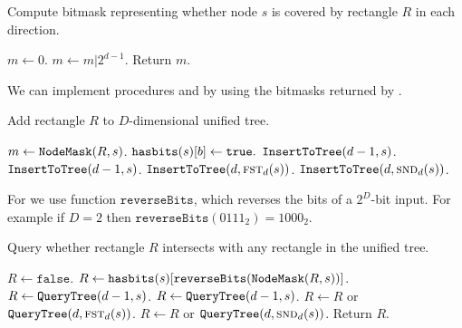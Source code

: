 \documentclass[english,gradu]{tktltiki2018}
\begin{document}
\begin{alg}\label{alg:maskof}
Compute bitmask representing whether node $s$ is covered by rectangle $R$ in each direction.
\begin{algorithmic}
	\State $m\gets 0$.
			\State $m\gets m | 2^{d-1}$.
		\EndIf
	\EndFor
	\State Return $m$.
\EndProcedure
\end{algorithmic}
\end{alg}

We can implement procedures \adddt and \checkdt by using the bitmasks returned by \maskof{}.

\begin{alg}\label{alg:uadd}
Add rectangle $R$ to $D$-dimensional unified tree.
\begin{algorithmic}
		\State $m\gets\texttt{NodeMask}(R,s)$.
				\State $\texttt{hasbits}(s)[b]\gets\texttt{true}.$
			\EndIf
		\EndFor
		\State $\texttt{InsertToTree}(d-1,s)$.
		\State $\texttt{InsertToTree}(d-1,s)$.
		\State $\texttt{InsertToTree}(d,\textsc{fst}_{d}(s))$.
		\State $\texttt{InsertToTree}(d,\textsc{snd}_{d}(s))$.
	\EndIf
\EndProcedure
\end{algorithmic}
\end{alg}

For \checkdt we use function $\texttt{reverseBits}$, which reverses the bits of a $2^D$-bit input.
For example if $D=2$ then $\texttt{reverseBits}(0111_2)=1000_2$.

\begin{alg}\label{alg:ucheck}
Query whether rectangle $R$ intersects with any rectangle in the unified tree.
\begin{algorithmic}
	\State $R\gets\texttt{false}$.
		\State $R\gets\texttt{hasbits}(s)[\texttt{reverseBits}(\texttt{NodeMask}(R,s))]$.
		\State $R\gets\texttt{QueryTree}(d-1,s)$.
		\State $R\gets\texttt{QueryTree}(d-1,s)$.
		\State $R\gets R$ or $\texttt{QueryTree}(d,\textsc{fst}_{d}(s))$.
		\State $R\gets R$ or $\texttt{QueryTree}(d,\textsc{snd}_{d}(s))$.
	\EndIf
	\State Return $R$.
\EndProcedure
\end{algorithmic}
\end{alg}
\end{document}
